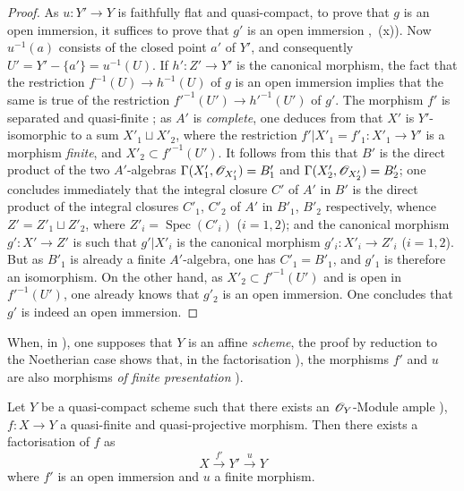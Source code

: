 \begin{proof}
As $u:Y'\to Y$ is faithfully flat and quasi-compact, to prove that $g$ is an open immersion, it suffices to prove that $g'$ is an open immersion ,~(x)).
Now $u^{-1}(a)$ consists of the closed point $a'$ of $Y'$, and consequently $U'=Y'-\{a'\}=u^{-1}(U)$.
If $h':Z'\to Y'$ is the canonical morphism, the fact that the restriction $f^{-1}(U)\to h^{-1}(U)$ of $g$ is an open immersion implies that the same is true of the restriction $f'^{-1}(U')\to h'^{-1}(U')$ of $g'$.
The morphism $f'$ is separated and quasi-finite ; as $A'$ is \emph{complete}, one deduces from  that $X'$ is $Y'$-isomorphic to a sum $X'_1\sqcup X'_2$, where the restriction $f'|X'_1=f'_1:X'_1\to Y'$ is a morphism \emph{finite}, and $X'_2\subset f'^{-1}(U')$.
It follows from this that $B'$ is the direct product of the two $A'$-algebras $\Gamma(X'_1,\mathscr{O}_{X'_1})=B'_1$ and $\Gamma(X'_2,\mathscr{O}_{X'_2})=B'_2$; one concludes immediately that the integral closure $C'$ of $A'$ in $B'$ is the direct product of the integral closures $C'_1$, $C'_2$ of $A'$ in $B'_1$, $B'_2$ respectively, whence $Z'=Z'_1\sqcup Z'_2$, where $Z'_i=\operatorname{Spec}(C'_i)$ ($i=1,2$); and the canonical morphism $g':X'\to Z'$ is such that $g'|X'_i$ is the canonical morphism $g'_i:X'_i\to Z'_i$ ($i=1,2$).
But as $B'_1$ is already a finite $A'$-algebra, one has $C'_1=B'_1$, and $g'_1$ is therefore an isomorphism.
On the other hand, as $X'_2\subset f'^{-1}(U')$ and is open in $f'^{-1}(U')$, one
already knows that $g'_2$ is an open immersion.
One concludes that $g'$ is indeed an open immersion.
\end{proof}

\begin{remark}[8.12.7]
\label{IV.8.12.7}
When, in ), one supposes that $Y$ is an affine \emph{scheme}, the proof by reduction to the Noetherian case shows that, in the factorisation ), the morphisms $f'$ and $u$ are also morphisms \emph{of finite presentation} ).
\end{remark}

\begin{corollary}[8.12.8]
\label{IV.8.12.8}
Let $Y$ be a quasi-compact scheme such that there exists an $\mathscr{O}_Y$-Module ample ), $f:X\to Y$ a quasi-finite and quasi-projective morphism.
Then there exists a factorisation of $f$ as
\[
X\xrightarrow{f'}Y'\xrightarrow{u}Y
\]
where $f'$ is an open immersion and $u$ a finite morphism.
\end{corollary}

